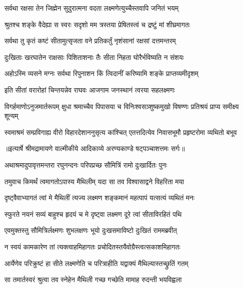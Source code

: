 \twolineshloka
{सर्वथा रक्षसा तेन जिह्मेन सुदुरात्मना}
{वदता लक्ष्मणेत्युच्चैस्तवापि जनितं भयम्} %

\twolineshloka
{श्रुतश्च शङ्के वैदेह्या स स्वरः सदृशो मम}
{त्रस्तया प्रेषितस्त्वं च द्रष्टुं मां शीघ्रमागतः} %

\twolineshloka
{सर्वथा तु कृतं कष्टं सीतामुत्सृजता वने}
{प्रतिकर्तुं नृशंसानां रक्षसां दत्तमन्तरम्} %

\twolineshloka
{दुःखिताः खरघातेन राक्षसाः पिशिताशनाः}
{तैः सीता निहता घोरैर्भविष्यति न संशयः} %

\twolineshloka
{अहोऽस्मि व्यसने मग्नः सर्वथा रिपुनाशन}
{किं त्विदानीं करिष्यामि शङ्के प्राप्तव्यमीदृशम्} %

\twolineshloka
{इति सीतां वरारोहां चिन्तयन्नेव राघवः}
{आजगाम जनस्थानं त्वरया सहलक्ष्मणः} %

\fourlineindentedshloka
{विगर्हमाणोऽनुजमार्तरूपम्}
{क्षुधा श्रमाच्चैव पिपासया च}
{विनिःश्वसञ्शुष्कमुखो विषण्णः}
{प्रतिश्रयं प्राप्य समीक्ष्य शून्यम्} %

\fourlineindentedshloka
{स्वमाश्रमं सम्प्रविगाह्य वीरो}
{विहारदेशाननुसृत्य कांश्चित्}
{एतत्तदित्येव निवासभूमौ}
{प्रहृष्टरोमा व्यथितो बभूव} %


{॥इत्यार्षे श्रीमद्रामायणे वाल्मीकीये आदिकाव्ये अरण्यकाण्डे षट्पञ्चाशत्तमः सर्गः॥}


\twolineshloka
{अथाश्रमादुपावृत्तमन्तरा रघुनन्दनः}
{परिपप्रच्छ सौमित्रिं रामो दुःखार्दितः पुनः} %

\twolineshloka
{तमुवाच किमर्थं त्वमागतोऽपास्य मैथिलीम्}
{यदा सा तव विश्वासाद्वने विहरिता मया} %

\twolineshloka
{दृष्ट्वैवाभ्यागतं त्वां मे मैथिलीं त्यज्य लक्ष्मण}
{शङ्कमानं महत्पापं यत्सत्यं व्यथितं मनः} %

\twolineshloka
{स्फुरते नयनं सव्यं बाहुश्च हृदयं च मे}
{दृष्ट्वा लक्ष्मण दूरे त्वां सीताविरहितं पथि} %

\twolineshloka
{एवमुक्तस्तु सौमित्रिर्लक्ष्मणः शुभलक्षणः}
{भूयो दुःखसमाविष्टो दुःखितं राममब्रवीत्} %

\twolineshloka
{न स्वयं कामकारेण तां त्यक्त्वाहमिहागतः}
{प्रचोदितस्तयैवोग्रैस्त्वत्सकाशमिहागतः} %

\twolineshloka
{आर्येणेव परिक्रुष्टं हा सीते लक्ष्मणेति च}
{परित्राहीति यद्वाक्यं मैथिल्यास्तच्छ्रुतिं गतम्} %

\twolineshloka
{सा तमार्तस्वरं श्रुत्वा तव स्नेहेन मैथिली}
{गच्छ गच्छेति मामाह रुदन्ती भयविह्वला} %

